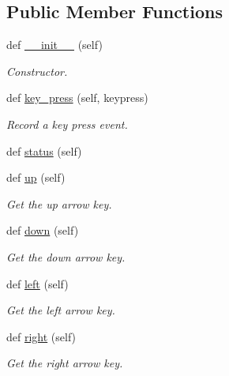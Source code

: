 \subsection*{Public Member Functions}
\begin{DoxyCompactItemize}
\item 
def \hyperlink{classbridges_1_1input__helper_1_1_input_helper_a1e5078f3c252de554409d3fdb49fcaaa}{\+\_\+\+\_\+init\+\_\+\+\_\+} (self)
\begin{DoxyCompactList}\small\item\em Constructor. \end{DoxyCompactList}\item 
def \hyperlink{classbridges_1_1input__helper_1_1_input_helper_ac1501918e03c17ae99e8d04d7576c58e}{key\+\_\+press} (self, keypress)
\begin{DoxyCompactList}\small\item\em Record a key press event. \end{DoxyCompactList}\item 
def \hyperlink{classbridges_1_1input__helper_1_1_input_helper_a49594a94ff16c661fc275191ff9217c9}{status} (self)
\item 
def \hyperlink{classbridges_1_1input__helper_1_1_input_helper_a26a435f11a7c2c202129ad9d86a36283}{up} (self)
\begin{DoxyCompactList}\small\item\em Get the up arrow key. \end{DoxyCompactList}\item 
def \hyperlink{classbridges_1_1input__helper_1_1_input_helper_a609f52d4b50d69a7b75c2bf125262413}{down} (self)
\begin{DoxyCompactList}\small\item\em Get the down arrow key. \end{DoxyCompactList}\item 
def \hyperlink{classbridges_1_1input__helper_1_1_input_helper_aea173110055fcc3470ac4b61c1608194}{left} (self)
\begin{DoxyCompactList}\small\item\em Get the left arrow key. \end{DoxyCompactList}\item 
def \hyperlink{classbridges_1_1input__helper_1_1_input_helper_a87226e5ae46e8c79dfcf87f7493b835a}{right} (self)
\begin{DoxyCompactList}\small\item\em Get the right arrow key. \end{DoxyCompactList}\item 

\end{DoxyCompactItemize}
